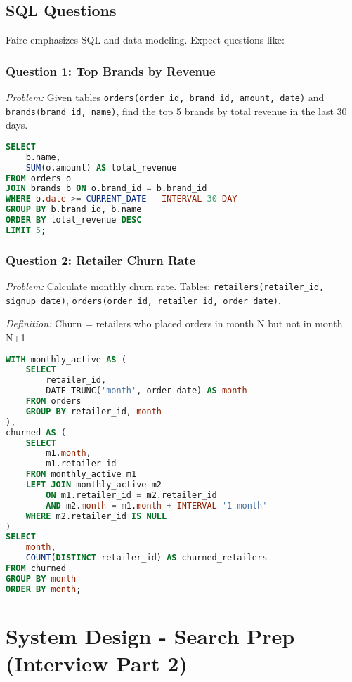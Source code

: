 \documentclass[11pt,letterpaper]{article}
\begin{document}
\subsection{SQL Questions}

Faire emphasizes SQL and data modeling. Expect questions like:

\subsubsection{Question 1: Top Brands by Revenue}

\textit{Problem:} Given tables \texttt{orders(order\_id, brand\_id, amount, date)} and \texttt{brands(brand\_id, name)}, find the top 5 brands by total revenue in the last 30 days.

\begin{lstlisting}[language=SQL]
SELECT
    b.name,
    SUM(o.amount) AS total_revenue
FROM orders o
JOIN brands b ON o.brand_id = b.brand_id
WHERE o.date >= CURRENT_DATE - INTERVAL 30 DAY
GROUP BY b.brand_id, b.name
ORDER BY total_revenue DESC
LIMIT 5;
\end{lstlisting}

\subsubsection{Question 2: Retailer Churn Rate}

\textit{Problem:} Calculate monthly churn rate. Tables: \texttt{retailers(retailer\_id, signup\_date)}, \texttt{orders(order\_id, retailer\_id, order\_date)}.

\textit{Definition:} Churn = retailers who placed orders in month N but not in month N+1.

\begin{lstlisting}[language=SQL]
WITH monthly_active AS (
    SELECT
        retailer_id,
        DATE_TRUNC('month', order_date) AS month
    FROM orders
    GROUP BY retailer_id, month
),
churned AS (
    SELECT
        m1.month,
        m1.retailer_id
    FROM monthly_active m1
    LEFT JOIN monthly_active m2
        ON m1.retailer_id = m2.retailer_id
        AND m2.month = m1.month + INTERVAL '1 month'
    WHERE m2.retailer_id IS NULL
)
SELECT
    month,
    COUNT(DISTINCT retailer_id) AS churned_retailers
FROM churned
GROUP BY month
ORDER BY month;
\end{lstlisting}

\section{System Design - Search Prep (Interview Part 2)}
\end{document}
